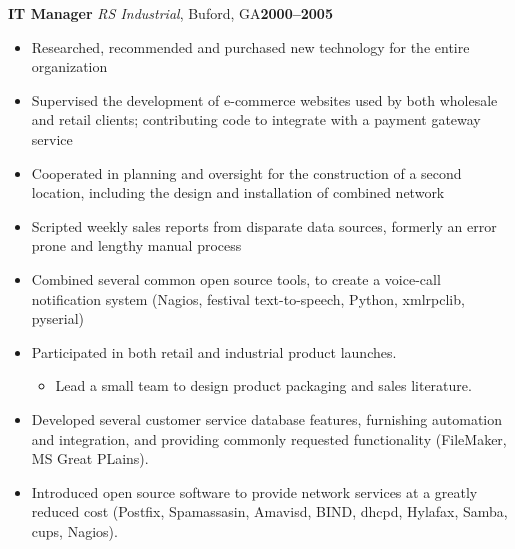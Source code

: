 \documentclass[11pt,letterpaper]{article}
\newcommand{\cvsection}[1]{%
\titleformat{\section}[hang]
  {\normalfont\bfseries}  %
  {\thesection}                   %
  {0pt}                           %
  {{\rule[0.5ex]{\textwidth - \widthof{~\MakeUppercase{#1}}}{2pt}%
    {~\MakeUppercase{#1}}}}       %
  {}                              %

\titlespacing{\section}{0em}{0em}{0em}

\section*{#1}
}
\newcommand{\cventry}[5]{%
{\bfseries{#2}} {\small{\textit{#3}, #4}}\hfill {\small\bfseries{#1}}
\begin{adjustwidth}{1em}{2em}{\raggedright{#5}}\end{adjustwidth}
}
\begin{document}
\cventry{2000--2005}{IT Manager}{RS Industrial}{Buford, GA}{%
\begin{small}
\begin{itemize}
\item Researched, recommended and purchased new technology for the entire
      organization
\item Supervised the development of e-commerce websites used by both wholesale
      and retail clients; contributing code to integrate with a payment gateway
      service
\item Cooperated in planning and oversight for the construction of a
      second location, including the design and installation of combined network
\item Scripted weekly sales reports from disparate data
      sources, formerly an error prone and lengthy manual process
\item Combined several common open source tools, to create a voice-call
      notification system (Nagios, festival text-to-speech, Python, xmlrpclib,
      pyserial)
\item Participated in both retail and industrial product launches.
  \begin{itemize}
  \item Lead a small team to design product packaging and sales literature.
  \end{itemize}
\item Developed several customer service database features, furnishing
      automation and integration, and providing commonly requested functionality
      (FileMaker, MS Great PLains).
\item Introduced open source software to provide network services at a greatly
      reduced cost (Postfix, Spamassasin, Amavisd, BIND, dhcpd, Hylafax, Samba,
      cups, Nagios).
\end{itemize}
\end{small}
}

\end{document}
